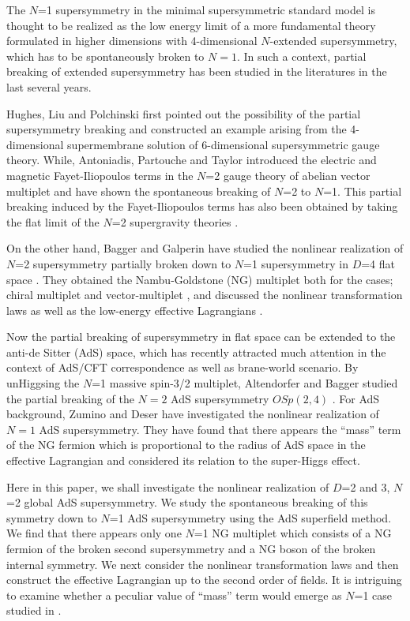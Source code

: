 \documentclass[a4paper,12pt]{article}
\begin{document}
The $N$=1 supersymmetry in the minimal supersymmetric standard model 
is thought to be realized as the low energy limit of a more
fundamental theory formulated in higher dimensions with 4-dimensional
$N$-extended supersymmetry, 
which has to be spontaneously broken to $N=1$. 
In such a context, partial breaking of extended supersymmetry has been 
studied in the literatures \cite{HLP,APT,FGP,BG1,BG2} 
in the last several years.

Hughes, Liu and Polchinski \cite{HLP} first pointed out the possibility of the
partial supersymmetry breaking
and constructed an example arising from 
the 4-dimensional supermembrane solution 
of 6-dimensional supersymmetric gauge theory.
While, Antoniadis, 
Partouche and Taylor \cite{APT} introduced the electric and magnetic 
Fayet-Iliopoulos terms  in the $N$=2 gauge theory of abelian vector multiplet 
and have shown 
the spontaneous breaking of $N$=2 to $N$=1.
This partial breaking induced by the Fayet-Iliopoulos terms 
has also been obtained by taking the flat limit of the $N$=2 supergravity 
theories \cite{FGP}.

On the other hand, 
Bagger and Galperin \cite{BG1,BG2} have studied the 
nonlinear realization of $N$=2 supersymmetry partially broken down to $N$=1 
supersymmetry in $D$=4 flat space \cite{BW,SW}.
They obtained the Nambu-Goldstone (NG) multiplet both for the cases; chiral
multiplet \cite{BG1} and vector-multiplet \cite{BG2}, and discussed 
the nonlinear transformation laws as well as the low-energy effective 
Lagrangians \cite{B}.
 
Now the partial breaking of supersymmetry in flat space can be extended to
the anti-de Sitter (AdS) space, which has recently attracted much attention 
in the context of AdS/CFT correspondence as well as brane-world scenario.
By unHiggsing the $N$=1 massive spin-3/2
multiplet, Altendorfer and Bagger studied the partial breaking of the 
$N=2$ AdS supersymmetry $OSp(2,4)$ \cite{AlB}.
For AdS background, Zumino and Deser \cite{Z,DZ} 
have investigated the nonlinear realization of $N=1$ AdS supersymmetry.
They have found that there appears the ``mass'' term of the NG fermion 
which is proportional to the radius of AdS space in the effective Lagrangian 
and considered its relation to the super-Higgs effect.

Here in this paper, we shall investigate the nonlinear realization of
$D$=2 and 3, $N$=2 global AdS supersymmetry. We study the
spontaneous breaking of this symmetry down to $N$=1 AdS
supersymmetry using the AdS superfield method.
We find that there appears only one $N$=1 NG multiplet which
consists of a NG fermion of the broken second 
supersymmetry and a NG boson of the broken internal symmetry.
We next consider the nonlinear transformation laws and then
construct the effective Lagrangian up to the second order of
fields.
It is intriguing to examine whether a peculiar value of ``mass'' 
term would emerge as $N$=1 case studied 
in \cite{Z}.
\end{document}
